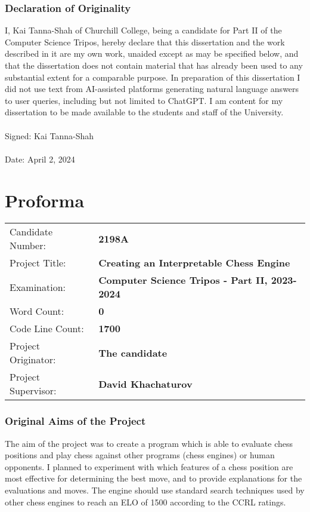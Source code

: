 \documentclass[12pt,a4paper]{article}
\begin{document}


\section*{Declaration of Originality}

I, Kai Tanna-Shah of Churchill College, being a candidate for Part II of the Computer Science Tripos, hereby declare that this dissertation and the work described in it are my own work, unaided except as may be specified below, and that the dissertation does not contain material that has already been used to any substantial extent for a comparable purpose. In preparation of this dissertation I did not use text from AI-assisted platforms generating natural language answers to user queries, including but not limited to ChatGPT. I am content for my dissertation to be made available to the students and staff of the University.
\\\\
Signed: Kai Tanna-Shah
\\\\
Date: April 2, 2024

\pagebreak

\part*{Proforma}
\large
\begin{tabular}{ l l}
    Candidate Number: & \textbf{2198A} \\ 
    Project Title:  & \textbf{Creating an Interpretable Chess Engine}\\  
    Examination: & \textbf{Computer Science Tripos - Part II, 2023-2024}\\
    Word Count: & \textbf{0}\\
    Code Line Count: & \textbf{1700}\\ 
    Project Originator: & \textbf{The candidate}\\   
    Project Supervisor: & \textbf{David Khachaturov}
   \end{tabular}

\normalsize

\section*{Original Aims of the Project}

The aim of the project was to create a program which is able to evaluate chess positions and play chess against other programs (chess engines) or human opponents. I planned to experiment with which features of a chess position are most effective for determining the best move, and to provide explanations for the evaluations and moves. The engine should use standard search techniques used by other chess engines to reach an ELO of 1500 according to the CCRL ratings.
\end{document}
